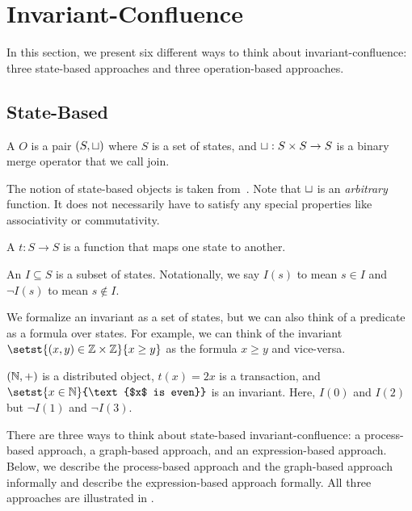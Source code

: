 \section{Invariant-Confluence}

In this section, we present six different ways to think about
invariant-confluence: three state-based approaches and three operation-based
approaches.

\subsection{State-Based}
\begin{definition}
  A  $O$ is a pair $(S, \sqcup)$ where
  $S$ is a set of states, and $\sqcup: S \times S \to S$ is a binary merge
  operator that we call join.
\end{definition}

The notion of state-based objects is taken from~\cite{shapiro2011conflict}.
Note that $\sqcup$ is an \emph{arbitrary} function. It does not necessarily have
to satisfy any special properties like associativity or commutativity.

\begin{definition}
  A  $t: S \to S$ is a function that maps one
  state to another.
\end{definition}

\begin{definition}
  An  $I \subseteq S$ is a subset of states. Notationally,
  we say $I(s)$ to mean $s \in I$ and $\lnot I(s)$ to mean $s \notin I$.
\end{definition}

We formalize an invariant as a set of states, but we can also think of a
predicate as a formula over states. For example, we can think of the invariant
$\setst{(x, y) \in \ints \times \ints}{x \geq y}$ as the formula $x \geq y$ and
vice-versa.

\begin{example}
  $(\mathbb{N}, +)$ is a distributed object, $t(x) = 2x$ is a transaction, and
  $\setst{x \in \nats}{\text{$x$ is even}}$ is an invariant. Here, $I(0)$ and
  $I(2)$ but $\lnot I(1)$ and $\lnot I(3)$.
\end{example}

There are three ways to think about state-based invariant-confluence: a
process-based approach, a graph-based approach, and an expression-based
approach. Below, we describe the process-based approach and the graph-based
approach informally and describe the expression-based approach formally. All
three approaches are illustrated in .

